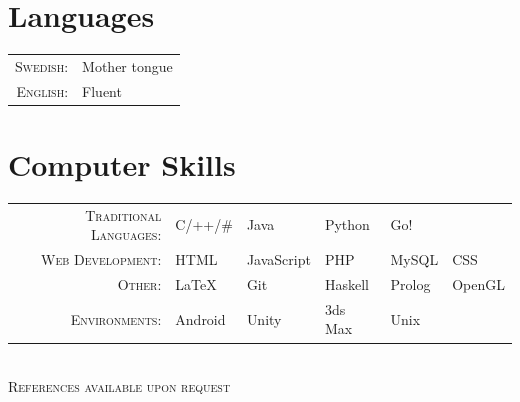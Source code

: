 \documentclass[a4paper,10pt]{article}
\begin{document}
    
    \section{Languages}
    \begin{tabular}{Dl}
        \textsc{Swedish:}&Mother tongue\\
        \textsc{English:}&Fluent\\
    \end{tabular}
    
    \section{Computer Skills}
    \def\arraystretch{1.2}%
    \begin{tabu}to \textwidth{r X[c] X[c] X[c] X[c] X[c]}
        \textsc{Traditional Languages:}		&	C/++/\#   &   Java		&	Python	&   Go! &		\\
        \textsc{Web Development:}		    &	 HTML     &   JavaScript&	PHP		&	MySQL    &  CSS	\\
        \textsc{Other:}				        & 	LaTeX     &   Git	    &   Haskell &   Prolog   &  OpenGL	\\
        \textsc{Environments:}		        &	Android   &   Unity		&	3ds Max	&	Unix     &		\\
    \end{tabu}
    \\[0.cm]
    
    \centering\textsc{ References available upon request}
    
\end{document}
